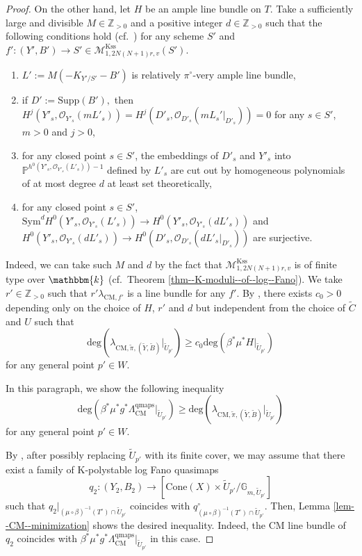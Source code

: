\documentclass[12pt,twoside]{amsart}
\theoremstyle{definition}
\begin{document}
\begin{proof}
    On the other hand, let $H$ be an ample line bundle on $T$.
    Take a sufficiently large and divisible $M\in\mathbb{Z}_{>0}$ and a positive integer $d\in\mathbb{Z}_{>0}$ such that the following conditions hold (cf.~\cite[Definition 6.1]{XZ1}) for any scheme $S'$ and $f'\colon (Y',B')\to S'\in \mathcal{M}^{\mathrm{Kss}}_{1,2N(N+1)r,v}(S')$.
\begin{enumerate}
\item $L':=M(-K_{Y'/S'}-B')$ is relatively $\pi^\circ$-very ample line bundle,
\item if $D':=\mathrm{Supp}(B'),$
then $H^j(Y'_s,\mathcal{O}_{Y'_s}(mL'_s))=H^j(D'_s,\mathcal{O}_{D'_s}(mL_s'|_{D'_s}))=0$ for any $s\in S'$, $m>0$ and $j>0$,
\item for any closed point $s\in S'$, the embeddings of $D'_s$ and $Y'_s$ into $\mathbb{P}^{h^0(Y'_s,\mathcal{O}_{Y'_s}(L'_s))-1}$ defined by $L'_s$ are cut out by homogeneous polynomials of at most degree $d$ at least set theoretically,
\item for any closed point $s\in S'$, $\mathrm{Sym}^dH^0(Y'_s,\mathcal{O}_{Y'_s}(L'_s))\to H^0(Y'_s,\mathcal{O}_{Y'_s}(dL'_s))$ and $H^0(Y'_s,\mathcal{O}_{Y'_s}(dL'_s))\to H^0(D'_s,\mathcal{O}_{D'_s}(dL'_s|_{D'_s}))$ are surjective.
\end{enumerate}
Indeed, we can take such $M$ and $d$ by the fact that $\mathcal{M}^{\mathrm{Kss}}_{1,2N(N+1)r,v}$ is of finite type over $\mathbbm{k}$ (cf.~Theorem \ref{thm--K-moduli--of--log--Fano}).
We take $r'\in\mathbb{Z}_{>0}$ such that $r'\lambda_{\mathrm
{CM},f'}$ is a line bundle for any $f'$.
By \cite[Theorem 7.2]{XZ1}, there exists $c_0>0$ depending only on the choice of $H$, $r'$ and $d$ but independent from the choice of $\tilde{C}$ and $U$ such that 
\[
\mathrm{deg}(\lambda_{\mathrm
{CM},\tilde{\pi},(\tilde{Y},\tilde{B})}|_{\tilde{U}_{p'}})\ge c_0\mathrm{deg}(\beta^*\mu^*H|_{\tilde{U}_{p'}})
\] 
for any general point $p'\in W$. 


In this paragraph, we show the following inequality 
\begin{equation*}\label{eq--positivity-of-CM-quasimaps}
\mathrm{deg}(\beta^*\mu^*g^*\Lambda^{\mathrm{qmaps}}_{\mathrm
{CM}}|_{\tilde{U}_{p'}})\ge\mathrm{deg}(\lambda_{\mathrm
{CM},\tilde{\pi},(\tilde{Y},\tilde{B})}|_{\tilde{U}_{p'}})
\end{equation*}
for any general point $p'\in W$.

By \cite[Theorem A.8]{AHLH}, after possibly replacing $\tilde{U}_{p'}$ with its finite cover, we may assume that there exist 
    a family of K-polystable log Fano quasimaps
    $$
    q_2\colon (Y_2,B_2)\to [\mathrm{Cone}(X)\times \tilde{U}_{p'}/\mathbb{G}_{m,\tilde{U}_{p'}}]
    $$
    such that $q_2|_{(\mu\circ\beta)^{-1}(T^\circ)\cap \tilde{U}_{p'}}$ coincides with $q^\circ_{(\mu\circ\beta)^{-1}(T^\circ)\cap \tilde{U}_{p'}}$.
Then, Lemma \ref{lem--CM--minimization} shows the desired inequality.
Indeed, the CM line bundle of $q_2$ coincides with $\beta^*\mu^*g^*\Lambda^{\mathrm{qmaps}}_{\mathrm
{CM}}|_{\tilde{U}_{p'}}$ in this case.



\end{proof}
\end{document}
